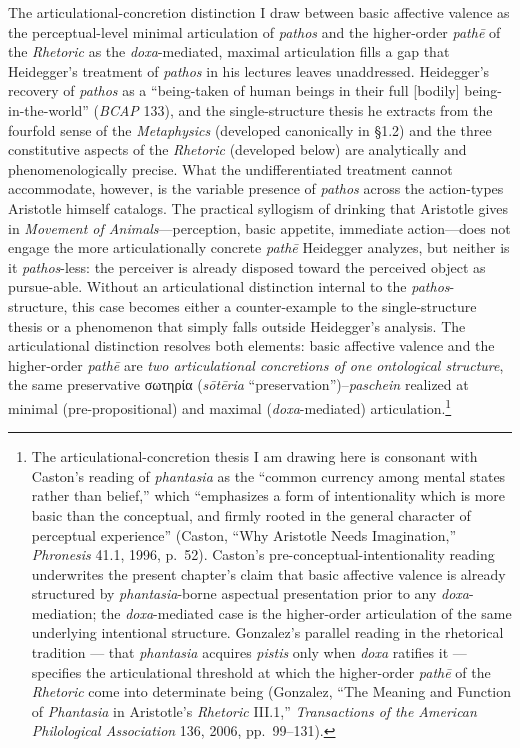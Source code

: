 \documentclass{article}
\newcommand{\gk}[1]{{\greekfont #1}}
\begin{document}
The articulational-concretion distinction I draw between basic affective valence as the perceptual-level minimal articulation of \textit{pathos} and the higher-order \textit{pathē} of the \textit{Rhetoric} as the \textit{doxa}-mediated, maximal articulation fills a gap that Heidegger's treatment of \textit{pathos} in his lectures leaves unaddressed. Heidegger's recovery of \textit{pathos} as a ``being-taken of human beings in their full [bodily] being-in-the-world'' (\textit{BCAP} 133), and the single-structure thesis he extracts from the fourfold sense of the \textit{Metaphysics} (developed canonically in \S1.2) and the three constitutive aspects of the \textit{Rhetoric} (developed below) are analytically and phenomenologically precise. What the undifferentiated treatment cannot accommodate, however, is the variable presence of \textit{pathos} across the action-types Aristotle himself catalogs. The practical syllogism of drinking that Aristotle gives in \textit{Movement of Animals}---perception, basic appetite, immediate action---does not engage the more articulationally concrete \textit{pathē} Heidegger analyzes, but neither is it \textit{pathos}-less: the perceiver is already disposed toward the perceived object as pursue-able. Without an articulational distinction internal to the \textit{pathos}-structure, this case becomes either a counter-example to the single-structure thesis or a phenomenon that simply falls outside Heidegger's analysis. The articulational distinction resolves both elements: basic affective valence and the higher-order \textit{pathē} are \textit{two articulational concretions of one ontological structure}, the same preservative \gk{σωτηρία} (\textit{sōtēria} ``preservation'')--\textit{paschein} realized at minimal (pre-propositional) and maximal (\textit{doxa}-mediated) articulation.\footnote{The articulational-concretion thesis I am drawing here is consonant with Caston's reading of \textit{phantasia} as the ``common currency among mental states rather than belief,'' which ``emphasizes a form of intentionality which is more basic than the conceptual, and firmly rooted in the general character of perceptual experience'' (Caston, ``Why Aristotle Needs Imagination,'' \textit{Phronesis} 41.1, 1996, p.~52). Caston's pre-conceptual-intentionality reading underwrites the present chapter's claim that basic affective valence is already structured by \textit{phantasia}-borne aspectual presentation prior to any \textit{doxa}-mediation; the \textit{doxa}-mediated case is the higher-order articulation of the same underlying intentional structure. Gonzalez's parallel reading in the rhetorical tradition --- that \textit{phantasia} acquires \textit{pistis} only when \textit{doxa} ratifies it --- specifies the articulational threshold at which the higher-order \textit{pathē} of the \textit{Rhetoric} come into determinate being (Gonzalez, ``The Meaning and Function of \textit{Phantasia} in Aristotle's \textit{Rhetoric} III.1,'' \textit{Transactions of the American Philological Association} 136, 2006, pp.~99--131).}
\end{document}
